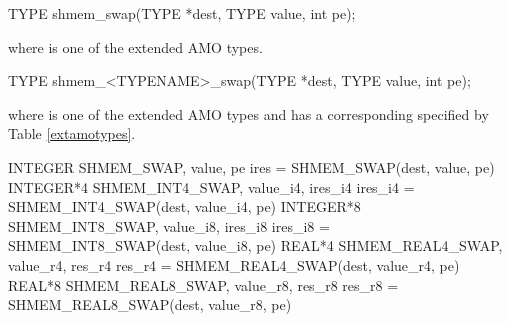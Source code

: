 
\begin{apidefinition}

\begin{C11synopsis}
TYPE shmem_swap(TYPE *dest, TYPE value, int pe);
\end{C11synopsis}
where \TYPE{} is one of the extended \ac{AMO} types.

\begin{Csynopsis}
TYPE shmem_<TYPENAME>_swap(TYPE *dest, TYPE value, int pe);
\end{Csynopsis}
where \TYPE{} is one of the extended \ac{AMO} types and has a corresponding \TYPENAME{} specified by Table \ref{extamotypes}.

 	  

\begin{Fsynopsis}
INTEGER SHMEM_SWAP, value, pe
ires = SHMEM_SWAP(dest, value, pe) 
INTEGER*4 SHMEM_INT4_SWAP, value_i4, ires_i4
ires_i4 = SHMEM_INT4_SWAP(dest, value_i4, pe) 
INTEGER*8 SHMEM_INT8_SWAP, value_i8, ires_i8
ires_i8 = SHMEM_INT8_SWAP(dest, value_i8, pe)
REAL*4 SHMEM_REAL4_SWAP, value_r4, res_r4
res_r4 = SHMEM_REAL4_SWAP(dest, value_r4, pe) 
REAL*8 SHMEM_REAL8_SWAP, value_r8, res_r8
res_r8 = SHMEM_REAL8_SWAP(dest, value_r8, pe)
\end{Fsynopsis}

\begin{apiarguments}
\end{apiarguments}


\end{apidefinition}
